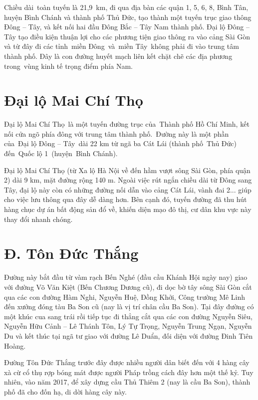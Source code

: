 Chiều dài toàn tuyến là 21,9 km, đi qua địa bàn các quận 1, 5, 6, 8, Bình Tân, huyện Bình Chánh và thành phố Thủ Đức, tạo thành một tuyến trục giao thông Đông – Tây, và kết nối hai đầu Đông Bắc – Tây Nam thành phố. Đại lộ Đông – Tây tạo điều kiện thuận lợi cho các phương tiện giao thông ra vào cảng Sài Gòn và từ đây đi các tỉnh miền Đông và miền Tây không phải đi vào trung tâm thành phố. Đây là con đường huyết mạch liên kết chặt chẽ các địa phương trong vùng kinh tế trọng điểm phía Nam.

\section{Đại lộ Mai Chí Thọ}

Đại lộ Mai Chí Thọ là một tuyến đường trục của Thành phố Hồ Chí Minh, kết nối cửa ngõ phía đông với trung tâm thành phố. Đường này là một phần của Đại lộ Đông – Tây dài 22 km từ ngã ba Cát Lái (thành phố Thủ Đức) đến Quốc lộ 1 (huyện Bình Chánh).

Đại lộ Mai Chí Thọ (từ Xa lộ Hà Nội về đến hầm vượt sông Sài Gòn, phía quận 2) dài 9 km, mặt đường rộng 140 m. Ngoài việc rút ngắn chiều dài từ Đông sang Tây, đại lộ này còn có những đường nối dẫn vào cảng Cát Lái, vành đai 2... giúp cho việc lưu thông qua đây dễ dàng hơn. Bên cạnh đó, tuyến đường đã thu hút hàng chục dự án bất động sản đổ về, khiến diện mạo đô thị, cư dân khu vực này thay đổi nhanh chóng.

\section{Đ. Tôn Đức Thắng}

Đường này bắt đầu từ vàm rạch Bến Nghé (đầu cầu Khánh Hội ngày nay) giao với đường Võ Văn Kiệt (Bến Chương Dương cũ), đi dọc bờ tây sông Sài Gòn cắt qua các con đường Hàm Nghi, Nguyễn Huệ, Đồng Khởi, Công trường Mê Linh đến xưởng đóng tàu Ba Son cũ (nay là vị trí chân cầu Ba Son). Tại đây đường có một khúc cua sang trái rồi tiếp tục đi thẳng cắt qua các con đường Nguyễn Siêu, Nguyễn Hữu Cảnh – Lê Thánh Tôn, Lý Tự Trọng, Nguyễn Trung Ngạn, Nguyễn Du và kết thúc tại ngã tư giao với đường Lê Duẩn, đối diện với đường Đinh Tiên Hoàng.

Đường Tôn Đức Thắng trước đây được nhiều người dân biết đến với 4 hàng cây xà cừ cổ thụ rợp bóng mát được người Pháp trồng cách đây hơn một thế kỷ. Tuy nhiên, vào năm 2017, để xây dựng cầu Thủ Thiêm 2 (nay là cầu Ba Son), thành phố đã cho đốn hạ, di dời hàng cây này.

